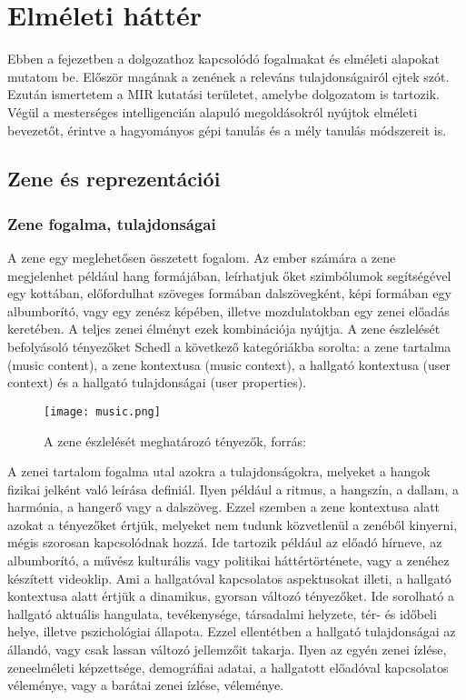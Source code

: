 \chapter{Elméleti háttér} 
\label{ch:theory}

Ebben a fejezetben a dolgozathoz kapcsolódó fogalmakat és elméleti alapokat mutatom be. Először magának a zenének a releváns tulajdonságairól ejtek szót. Ezután ismertetem a MIR kutatási területet, amelybe dolgozatom is tartozik. Végül a mesterséges intelligencián alapuló megoldásokról nyújtok elméleti bevezetőt, érintve a hagyományos gépi tanulás és a mély tanulás módszereit is.

\section{Zene és reprezentációi} 

\subsection{Zene fogalma, tulajdonságai}

A zene egy meglehetősen összetett fogalom. Az ember számára a zene megjelenhet például hang formájában, leírhatjuk őket szimbólumok segítségével egy kottában, előfordulhat szöveges formában dalszövegként, képi formában egy albumborító, vagy egy zenész képében, illetve mozdulatokban egy zenei előadás keretében. A teljes zenei élményt ezek kombinációja nyújtja. A zene észlelését befolyásoló tényezőket Schedl \cite{Schedl2013} a következő kategóriákba sorolta: a zene tartalma (music content), a zene kontextusa (music context), a hallgató kontextusa (user context) és a hallgató tulajdonságai (user properties). \cite{Schedl2014}

\begin{figure}[H]
  \texttt{[image: music.png]}
  \centering
  \caption{A zene észlelését meghatározó tényezők, forrás: \cite{Schedl2013} }
\end{figure}

A zenei tartalom fogalma utal azokra a tulajdonságokra, melyeket a hangok fizikai jelként való leírása definiál. Ilyen például a ritmus, a hangszín, a dallam, a harmónia, a hangerő vagy a dalszöveg. Ezzel szemben a zene kontextusa alatt azokat a tényezőket értjük, melyeket nem tudunk közvetlenül a zenéből kinyerni, mégis szorosan kapcsolódnak hozzá. Ide tartozik például az előadó hírneve, az albumborító, a művész kulturális vagy politikai háttértörténete, vagy a zenéhez készített videoklip. Ami a hallgatóval kapcsolatos aspektusokat illeti, a hallgató kontextusa alatt értjük a dinamikus, gyorsan változó tényezőket. Ide sorolható a hallgató aktuális hangulata, tevékenysége, társadalmi helyzete, tér- és időbeli helye, illetve pszichológiai állapota. Ezzel ellentétben a hallgató tulajdonságai az állandó, vagy csak lassan változó jellemzőit takarja. Ilyen az egyén zenei ízlése, zeneelméleti képzettsége, demográfiai adatai, a hallgatott előadóval kapcsolatos véleménye, vagy a barátai zenei ízlése, véleménye. \cite{Schedl2014}

